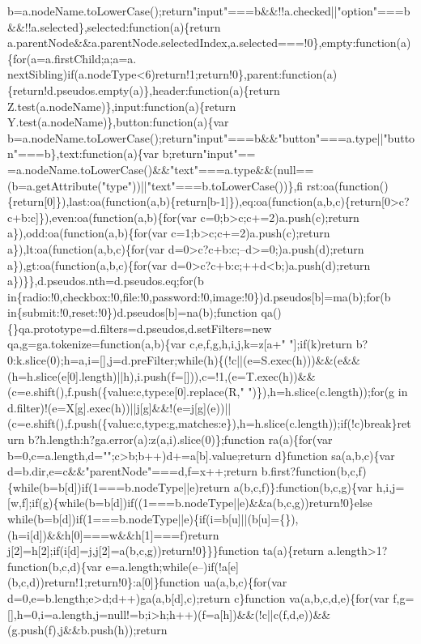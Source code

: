 \begin{DoxyCode}
{      b=a.nodeName.toLowerCase();return"input"===b&&!!a.checked||"option"===b&&!!a.selected\},selected:function(a)\{return
       a.parentNode&&a.parentNode.selectedIndex,a.selected===!0\},empty:function(a)\{for(a=a.firstChild;a;a=a.
      nextSibling)if(a.nodeType<6)return!1;return!0\},parent:function(a)\{return!d.pseudos.empty(a)\},header:function(a)\{return Z.test(a.nodeName)\},input:function(a)\{return Y.test(a.nodeName)\},button:function(a)\{var
       b=a.nodeName.toLowerCase();return"input"===b&&"button"===a.type||"button"===b\},text:function(a)\{var
       b;return"input"==
      =a.nodeName.toLowerCase()&&"text"===a.type&&(null==(b=a.getAttribute("type"))||"text"===b.toLowerCase())\},fi
      rst:oa(function()\{return[0]\}),last:oa(function(a,b)\{return[b-1]\}),eq:oa(function(a,b,c)\{return[0>c?c+b:c]\}),even:oa(function(a,b)\{for(var c=0;b>c;c+=2)a.push(c);return a\}),odd:oa(function(a,b)\{for(var
       c=1;b>c;c+=2)a.push(c);return a\}),lt:oa(function(a,b,c)\{for(var d=0>c?c+b:c;--d>=0;)a.push(d);return
       a\}),gt:oa(function(a,b,c)\{for(var d=0>c?c+b:c;++d<b;)a.push(d);return a\})\}\},d.pseudos.nth=d.pseudos.eq;for(b
       in\{radio:!0,checkbox:!0,file:!0,password:!0,image:!0\})d.pseudos[b]=ma(b);for(b
       in\{submit:!0,reset:!0\})d.pseudos[b]=na(b);function qa()\{\}qa.prototype=d.filters=d.pseudos,d.setFilters=new qa,g=ga.tokenize=function(a,b)\{var
       c,e,f,g,h,i,j,k=z[a+" "];if(k)return
       b?0:k.slice(0);h=a,i=[],j=d.preFilter;while(h)\{(!c||(e=S.exec(h)))&&(e&&(h=h.slice(e[0].length)||h),i.push(f=[])),c=!1,(e=T.exec(h))&&(c=e.shift(),f.push(\{value:c,type:e[0].replace(R,"
       ")\}),h=h.slice(c.length));for(g in
       d.filter)!(e=X[g].exec(h))||j[g]&&!(e=j[g](e))||(c=e.shift(),f.push(\{value:c,type:g,matches:e\}),h=h.slice(c.length));if(!c)break\}return b?h.length:h?ga.error(a):z(a,i).slice(0)\};function
       ra(a)\{for(var b=0,c=a.length,d="";c>b;b++)d+=a[b].value;return d\}function sa(a,b,c)\{var
       d=b.dir,e=c&&"parentNode"===d,f=x++;return b.first?function(b,c,f)\{while(b=b[d])if(1===b.nodeType||e)return
       a(b,c,f)\}:function(b,c,g)\{var h,i,j=[w,f];if(g)\{while(b=b[d])if((1===b.nodeType||e)&&a(b,c,g))return!0\}else
       while(b=b[d])if(1===b.nodeType||e)\{if(i=b[u]||(b[u]=\{\}),(h=i[d])&&h[0]===w&&h[1]===f)return
       j[2]=h[2];if(i[d]=j,j[2]=a(b,c,g))return!0\}\}\}function ta(a)\{return a.length>1?function(b,c,d)\{var
       e=a.length;while(e--)if(!a[e](b,c,d))return!1;return!0\}:a[0]\}function ua(a,b,c)\{for(var d=0,e=b.length;e>d;d++)ga(a,b[d],c);return c\}function
       va(a,b,c,d,e)\{for(var f,g=[],h=0,i=a.length,j=null!=b;i>h;h++)(f=a[h])&&(!c||c(f,d,e))&&(g.push(f),j&&b.push(h));return
}
\end{DoxyCode}
